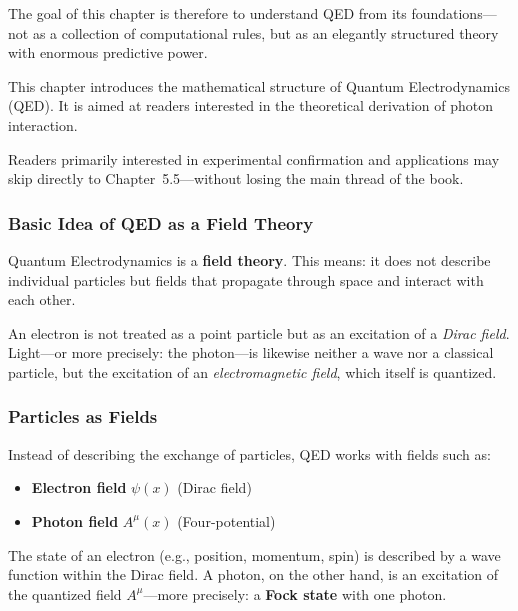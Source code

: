 The goal of this chapter is therefore to understand QED from its foundations—not as a collection of computational rules, but as an elegantly structured theory with enormous predictive power.

\vspace{1em}
\begin{tcolorbox}[hinweisbox, title=Note for Readers]
	\label{box:Hinweis füe Leser}
	This chapter introduces the mathematical structure of Quantum Electrodynamics (QED). It is aimed at readers interested in the theoretical derivation of photon interaction. 
	
	Readers primarily interested in experimental confirmation and applications may skip directly to Chapter~5.5—without losing the main thread of the book.
\end{tcolorbox}


\subsubsection{Basic Idea of QED as a Field Theory}

Quantum Electrodynamics is a \textbf{field theory}. This means: it does not describe individual particles but fields that propagate through space and interact with each other.

An electron is not treated as a point particle but as an excitation of a \emph{Dirac field}. Light—or more precisely: the photon—is likewise neither a wave nor a classical particle, but the excitation of an \emph{electromagnetic field}, which itself is quantized.

\subsubsection*{Particles as Fields}
Instead of describing the exchange of particles, QED works with fields such as:
\begin{itemize}
	\item \textbf{Electron field} $\psi(x)$ (Dirac field)
	\item \textbf{Photon field} $A^\mu(x)$ (Four-potential)
\end{itemize}

The state of an electron (e.g., position, momentum, spin) is described by a wave function within the Dirac field. A photon, on the other hand, is an excitation of the quantized field $A^\mu$—more precisely: a \textbf{Fock state} with one photon.

